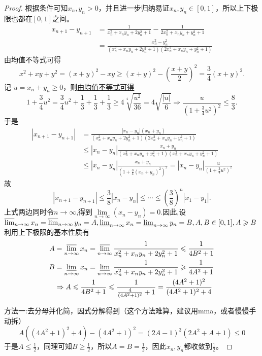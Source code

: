 \documentclass[../../main.tex]{subfiles}
\begin{document}
\begin{proof}
根据条件可知\(x_n,y_n > 0\)，并且进一步归纳易证\(x_n,y_n\in[0,1]\)，所以上下极限也都在\([0,1]\)之间。
\begin{align*}
x_{n + 1}-y_{n + 1}&=\frac{1}{x_n^2 + x_ny_n + 2y_n^2 + 1}-\frac{1}{2x_n^2 + x_ny_n + y_n^2 + 1}\\
&=\frac{x_n^2 - y_n^2}{(x_n^2 + x_ny_n + 2y_n^2 + 1)(2x_n^2 + x_ny_n + y_n^2 + 1)}
\end{align*}
由均值不等式可得
\[
x^2 + xy + y^2=(x + y)^2 - xy\geqslant (x + y)^2 - \left(\frac{x + y}{2}\right)^2=\frac{3}{4}(x + y)^2.
\]
记 \(u = x_n + y_n\geqslant  0\)，则\hyperlink{均值放缩的思路}{由均值不等式可得}
\[
1+\frac{3}{4}u^2=\frac{3}{4}u^2+\frac{1}{3}+\frac{1}{3}+\frac{1}{3}\geqslant  4\sqrt[4]{\frac{u^2}{36}}=4\sqrt{\frac{|u|}{6}}\Rightarrow \frac{u}{(1+\frac{3}{4}u^2)^2}\le \frac{8}{3}.
\]
于是
\begin{align*}
|x_{n + 1}-y_{n + 1}|&=\frac{|x_n - y_n|(x_n + y_n)}{(x_{n}^{2}+x_ny_n + 2y_{n}^{2}+1)(2x_{n}^{2}+x_ny_n + y_{n}^{2}+1)}\\
&\le |x_n - y_n|\frac{x_n + y_n}{(x_{n}^{2}+x_ny_n + y_{n}^{2}+1)(x_{n}^{2}+x_ny_n + y_{n}^{2}+1)}\\
&\le |x_n - y_n|\frac{x_n + y_n}{(1+\frac{3}{4}(x_n + y_n)^2)^2}=|x_n - y_n|\frac{u}{(1+\frac{3}{4}u^2)^2}
\end{align*}
故
\[
|x_{n + 1}-y_{n + 1}|\le \frac{3}{8}|x_n - y_n|\le \cdots \le (\frac{3}{8})^n|x_1 - y_1|.
\]
上式两边同时令$n\to \infty$,得到$\underset{n\rightarrow \infty}{\lim}\left( x_n-y_n \right) =0$.因此,设
\(\varlimsup_{n\rightarrow\infty}x_n=\varlimsup_{n\rightarrow\infty}y_n = A,\varliminf_{n\rightarrow\infty}x_n=\varliminf_{n\rightarrow\infty}y_n = B,A,B\in[0,1],A\geqslant  B\)
利用上下极限的基本性质有
\begin{align*}
A&=\varlimsup_{n\rightarrow\infty}x_n=\varlimsup_{n\rightarrow\infty}\frac{1}{x_n^2 + x_ny_n + 2y_n^2 + 1}\leqslant \frac{1}{4B^2 + 1}\\
B&=\varliminf_{n\rightarrow\infty}x_n=\varliminf_{n\rightarrow\infty}\frac{1}{x_n^2 + x_ny_n + 2y_n^2 + 1}\geqslant \frac{1}{4A^2 + 1}\\
&\Rightarrow A\leqslant \frac{1}{4B^2 + 1}\leqslant \frac{1}{\frac{4}{(4A^2 + 1)^2}+1}=\frac{(4A^2 + 1)^2}{(4A^2 + 1)^2 + 4}
\end{align*}

{\color{blue}方法一:}去分母并化简，因式分解得到（这个方法难算，建议用mma，或者慢慢手动拆）
\[A((4A^2 + 1)^2 + 4)-(4A^2 + 1)^2=(2A - 1)^3(2A^2 + A + 1)\leqslant 0\]
于是\(A\leqslant \frac{1}{2}\)，同理可知\(B\geqslant \frac{1}{2}\)，所以\(A = B=\frac{1}{2}\)，因此\(x_n,y_n\)都收敛到\(\frac{1}{2}\)。


\end{proof}
\end{document}
